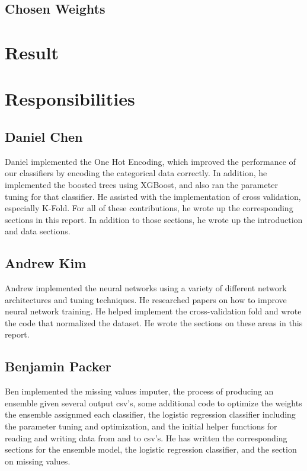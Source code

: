 \documentclass[twoside,11pt]{article}
\theoremstyle{definition}
\begin{document}
  \subsection{Chosen Weights}

\section{Result}

\section{Responsibilities}

  \subsection{Daniel Chen}
    Daniel implemented the One Hot Encoding, which improved the performance of our classifiers by encoding the categorical data correctly. In addition, he implemented the boosted trees using XGBoost, and also ran the parameter tuning for that classifier. He assisted with the implementation of cross validation, especially K-Fold. For all of these contributions, he wrote up the corresponding sections in this report. In addition to those sections, he wrote up the introduction and data sections.

  \subsection{Andrew Kim}
    Andrew implemented the neural networks using a variety of different network architectures and tuning techniques. He researched papers on how to improve neural network training. He helped implement the cross-validation fold and wrote the code that normalized the dataset. He wrote the sections on these areas in this report. 

  \subsection{Benjamin Packer}
    Ben implemented the missing values imputer, the process of producing an ensemble given several output csv's, some additional code to optimize the weights the ensemble assignmed each classifier, the logistic regression classifier including the parameter tuning and optimization, and the initial helper functions for reading and writing data from and to csv's. He has written the corresponding sections for the ensemble model, the logistic regression classifier, and the section on missing values.
\end{document}
